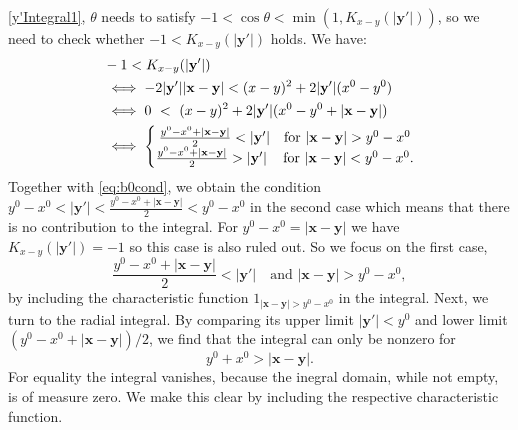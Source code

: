 \documentclass[b5paper,draft,openbib,12pt]{memoir}
\newcommand{\vx}{\mathbf{x}}
\newcommand{\vy}{\mathbf{y}}
\begin{document}
\eqref{y'Integral1}, \(\theta\) needs to satisfy 
\(-1<\cos\theta<\min(1,K_{x-y}(|\vy'|))\), so we 
need to check whether \(-1<K_{x-y}(|\vy'|)\) holds. 
We have:
\begin{align}\notag
    &-1 < K_{x-y}(|\vy'|) \\
    &\iff -2|\vy'||\vx-\vy|<(x-y)^2+2|\vy'|(x^0-y^0)\nonumber\\
    &\iff 0~<~(x-y)^2+2|\vy'|(x^0-y^0+|\vx-\vy|)\nonumber\\
    &\iff \left\{\begin{matrix}
    \frac{y^0-x^0+|\vx-\vy|}{2}<|\vy'|  \quad \text{for } |\vx-\vy|>y^0-x^0\\
    \frac{y^0-x^0+|\vx-\vy|}{2}>|\vy'| \quad \, \text{for } |\vx-\vy|<y^0-x^0.
    \end{matrix}\right.
\end{align}
Together with \eqref{eq:b0cond}, we obtain the 
condition \(y^0-x^0<|\vy'|<
\frac{y^0-x^0+|\vx-\vy|}{2}<y^0-x^0\) in the second 
case which means that there is no contribution to 
the integral. For \(y^0-x^0=|\vx-\vy|\) we have 
\(K_{x-y}(|\vy'|)=-1\) so this case is also ruled out. 
So we focus on the first case,
\begin{equation}
	\frac{y^0-x^0+|\vx-\vy|}{2}<|\vy'|  \quad \text{and } |\vx-\vy|>y^0-x^0,
\label{eq:xycond1}
\end{equation}
by including the characteristic function 
$1_{|\vx-\vy|>y^0-x^0}$ in the integral. Next, we turn 
to the radial integral. By comparing its upper 
limit $|\vy'|<y^0$ and lower limit $(y^0-x^0+
|\vx-\vy|)/2$, we find that the integral can only be 
nonzero for
\begin{equation}
	y^0+x^0>|\vx-\vy|.
	\label{eq:xycond2}
\end{equation}
For equality the integral vanishes, because the inegral domain,
while not empty, 
is of measure zero. We make this clear by including the respective 
characteristic function.
\end{document}
